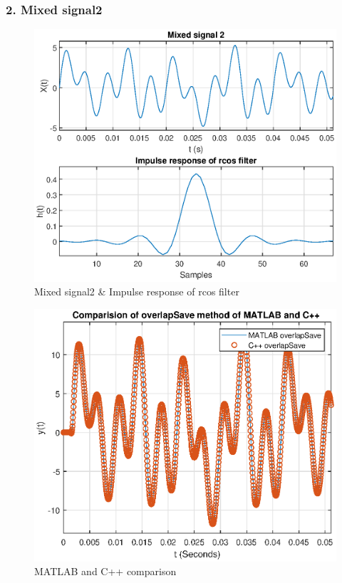 \begin{refsection}
\subsubsection{2. Mixed signal2}
\begin{figure}[h]
	\centering
	\includegraphics[width=12cm]{./algorithms/overlap_save/figures/mixed_signal2.eps}
	\caption{Mixed signal2 \& Impulse response of rcos filter}\label{mixed_signal2}
\end{figure}

\begin{figure}[h]
	\centering
	\includegraphics[width=12.5cm]{./algorithms/overlap_save/figures/mixed_signal2_matlab_and_C++.eps}
	\caption{MATLAB and C++ comparison}\label{mixed_signal2_matlab_and_C++}
\end{figure}


\end{refsection}
